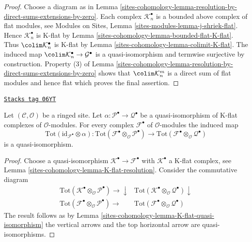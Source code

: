 \begin{proof}
Choose a diagram as in
Lemma \ref{sites-cohomology-lemma-resolution-by-direct-sums-extensions-by-zero}.
Each complex $\mathcal{K}_n^\bullet$ is a bounded
above complex of flat modules, see
Modules on Sites, Lemma \ref{sites-modules-lemma-j-shriek-flat}.
Hence $\mathcal{K}_n^\bullet$ is K-flat by
Lemma \ref{sites-cohomology-lemma-bounded-flat-K-flat}.
Thus $\colim \mathcal{K}_n^\bullet$ is K-flat by
Lemma \ref{sites-cohomology-lemma-colimit-K-flat}.
The induced map
$\colim \mathcal{K}_n^\bullet \to \mathcal{G}^\bullet$
is a quasi-isomorphism and termwise surjective by construction.
Property (3) of Lemma \ref{sites-cohomology-lemma-resolution-by-direct-sums-extensions-by-zero}
shows that $\colim \mathcal{K}_n^m$ is a direct sum of
flat modules and hence flat which proves the final assertion.
\end{proof}

\begin{lemma}
\label{sites-cohomology-lemma-derived-tor-quasi-isomorphism-other-side}
\href{https://stacks.math.columbia.edu/tag/06YT}{\texttt{Stacks tag 06YT}}

Let $(\mathcal{C}, \mathcal{O})$ be a ringed site. Let
$\alpha : \mathcal{P}^\bullet \to \mathcal{Q}^\bullet$ be a
quasi-isomorphism of K-flat complexes of $\mathcal{O}$-modules.
For every complex $\mathcal{F}^\bullet$ of $\mathcal{O}$-modules
the induced map
$$
\text{Tot}(\text{id}_{\mathcal{F}^\bullet} \otimes \alpha) :
\text{Tot}(\mathcal{F}^\bullet \otimes_\mathcal{O} \mathcal{P}^\bullet)
\longrightarrow
\text{Tot}(\mathcal{F}^\bullet \otimes_\mathcal{O} \mathcal{Q}^\bullet)
$$
is a quasi-isomorphism.
\end{lemma}

\begin{proof}
Choose a quasi-isomorphism $\mathcal{K}^\bullet \to \mathcal{F}^\bullet$
with $\mathcal{K}^\bullet$ a K-flat complex, see
Lemma \ref{sites-cohomology-lemma-K-flat-resolution}.
Consider the commutative diagram
$$
\begin{array}{cc}\text{Tot}(\mathcal{K}^\bullet
\otimes_\mathcal{O} \mathcal{P}^\bullet) \longrightarrow\downarrow & \text{Tot}(\mathcal{K}^\bullet
\otimes_\mathcal{O} \mathcal{Q}^\bullet) \downarrow \\ \text{Tot}(\mathcal{F}^\bullet
\otimes_\mathcal{O} \mathcal{P}^\bullet) \longrightarrow & \text{Tot}(\mathcal{F}^\bullet
\otimes_\mathcal{O} \mathcal{Q}^\bullet)\end{array}
$$
The result follows as by
Lemma \ref{sites-cohomology-lemma-K-flat-quasi-isomorphism}
the vertical arrows and the top horizontal arrow are quasi-isomorphisms.
\end{proof}

